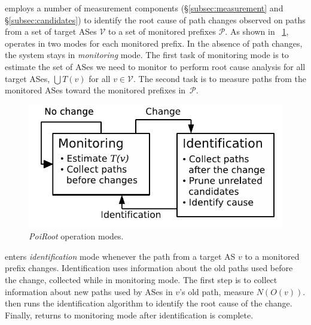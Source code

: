 \ouralgo employs a number of measurement components
(\S\ref{subsec:measurement} and \S\ref{subsec:candidates}) to identify
the root cause of path changes observed on paths from a set of target
ASes $\mathcal{V}$ to a set of monitored prefixes $\mathcal{P}$. 
As shown in \fig~\ref{fig:arch}, \ouralgo operates in two modes for each monitored prefix. In
the absence of path changes, the system stays in \emph{monitoring} mode.
The first task of monitoring mode is to estimate the set of ASes we need
to monitor to perform root cause analysis for all target ASes,
\ie $\bigcup{T(v)}$ for all $v \in \mathcal{V}$.  The second task is to
measure paths from the monitored ASes toward the monitored prefixes in~$\mathcal{P}$.  

\begin{figure}[t]
\begin{centering}
\includegraphics[width=0.9\columnwidth]{figs/arch2.pdf}
\vspace{-5mm}
\caption{\emph{PoiRoot} operation modes.}
\label{fig:arch}
\end{centering}
\vspace{.5em}
\end{figure}

\ouralgo enters \emph{identification} mode whenever the path from a
target AS $v$ to a monitored prefix changes.  Identification uses
information about the old paths used
before the change, collected while in monitoring mode.  The first step is to collect 
information about new paths used by ASes in $v$'s old path, \ie measure
$N(O(v))$. \ouralgo then runs the identification algorithm to
identify the root cause of the change.  Finally, \ouralgo returns to
monitoring mode after identification is complete.

